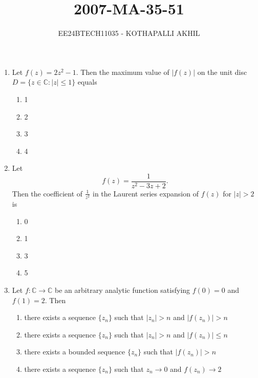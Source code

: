 \documentclass[journal]{IEEEtran}
\numberwithin{figure}{enumi}
\begin{document}


\title{2007-MA-35-51}
\author{EE24BTECH11035 - KOTHAPALLI AKHIL}
{\let\newpage\relax\maketitle}

\begin{enumerate}
\item Let $f(z) = 2z^2 - 1$. Then the maximum value of $|f(z)|$ on the unit disc $D = \{z \in \mathbb{C}: |z| \leq 1\}$ equals  
\begin{enumerate} 
    \item 1  
    \item 2  
    \item 3  
    \item 4  
\end{enumerate}

\item Let  
\begin{equation*}
f(z) = \frac{1}{z^2 - 3z + 2}.
\end{equation*}  
Then the coefficient of $\frac{1}{z^2}$ in the Laurent series expansion of $f(z)$ for $|z| > 2$ is
\begin{enumerate}
    \item 0
    \item 1
    \item 3
    \item 5
\end{enumerate}

\item  Let $f: \mathbb{C} \to \mathbb{C}$ be an arbitrary analytic function satisfying $f(0) = 0$ and $f(1) = 2$. Then
\begin{enumerate}
    \item there exists a sequence $\{z_n\}$ such that $|z_n| > n$ and $|f(z_n)| > n$
    \item there exists a sequence $\{z_n\}$ such that $|z_n| > n$ and $|f(z_n)| \leq n$
    \item there exists a bounded sequence $\{z_n\}$ such that $|f(z_n)| > n$
    \item there exists a sequence $\{z_n\}$ such that $z_n \to 0$ and $f(z_n) \to 2$
\end{enumerate}


\end{enumerate}
\end{document}
